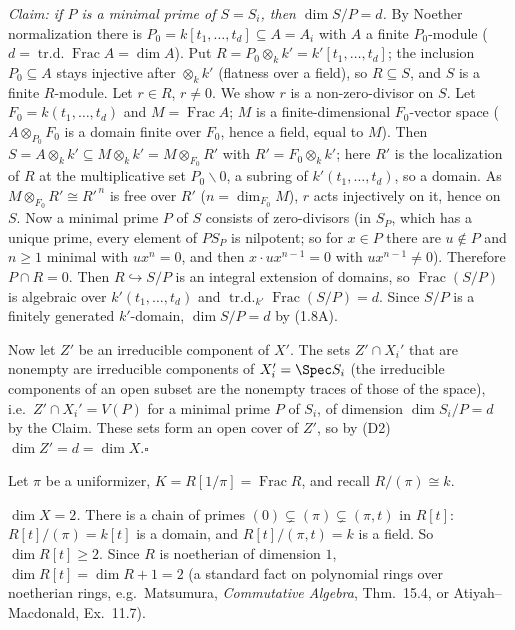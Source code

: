 \documentclass[11pt]{article}
\begin{document}
\emph{Claim: if $P$ is a minimal prime of $S=S_i$, then $\dim S/P=d$.} By Noether normalization there is $P_0=k[t_1,\dots,t_d]\subseteq A=A_i$ with $A$ a finite $P_0$-module ($d=\operatorname{tr.d.}\operatorname{Frac}A=\dim A$). Put $R=P_0\otimes_kk'=k'[t_1,\dots,t_d]$; the inclusion $P_0\subseteq A$ stays injective after $\otimes_kk'$ (flatness over a field), so $R\subseteq S$, and $S$ is a finite $R$-module. Let $r\in R$, $r\ne0$. We show $r$ is a non-zero-divisor on $S$. Let $F_0=k(t_1,\dots,t_d)$ and $M=\operatorname{Frac}A$; $M$ is a finite-dimensional $F_0$-vector space ($A\otimes_{P_0}F_0$ is a domain finite over $F_0$, hence a field, equal to $M$). Then $S=A\otimes_kk'\subseteq M\otimes_kk'=M\otimes_{F_0}R'$ with $R'=F_0\otimes_kk'$; here $R'$ is the localization of $R$ at the multiplicative set $P_0\smallsetminus0$, a subring of $k'(t_1,\dots,t_d)$, so a domain. As $M\otimes_{F_0}R'\cong R'^{\,n}$ is free over $R'$ ($n=\dim_{F_0}M$), $r$ acts injectively on it, hence on $S$. Now a minimal prime $P$ of $S$ consists of zero-divisors (in $S_P$, which has a unique prime, every element of $PS_P$ is nilpotent; so for $x\in P$ there are $u\notin P$ and $n\ge1$ minimal with $ux^n=0$, and then $x\cdot ux^{n-1}=0$ with $ux^{n-1}\ne0$). Therefore $P\cap R=0$. Then $R\hookrightarrow S/P$ is an integral extension of domains, so $\operatorname{Frac}(S/P)$ is algebraic over $k'(t_1,\dots,t_d)$ and $\operatorname{tr.d.}_{k'}\operatorname{Frac}(S/P)=d$. Since $S/P$ is a finitely generated $k'$-domain, $\dim S/P=d$ by (1.8A).

Now let $Z'$ be an irreducible component of $X'$. The sets $Z'\cap X_i'$ that are nonempty are irreducible components of $X'_i=\Spec S_i$ (the irreducible components of an open subset are the nonempty traces of those of the space), i.e.\ $Z'\cap X_i'=V(P)$ for a minimal prime $P$ of $S_i$, of dimension $\dim S_i/P=d$ by the Claim. These sets form an open cover of $Z'$, so by (D2) $\dim Z'=d=\dim X$.\hfill$\square$

\pf
Let $\pi$ be a uniformizer, $K=R[1/\pi]=\operatorname{Frac}R$, and recall $R/(\pi)\cong k$.

\emph{$\dim X=2$.} There is a chain of primes $(0)\subsetneq(\pi)\subsetneq(\pi,t)$ in $R[t]$: $R[t]/(\pi)=k[t]$ is a domain, and $R[t]/(\pi,t)=k$ is a field. So $\dim R[t]\ge2$. Since $R$ is noetherian of dimension $1$, $\dim R[t]=\dim R+1=2$ (a standard fact on polynomial rings over noetherian rings, e.g.\ Matsumura, \emph{Commutative Algebra}, Thm.~15.4, or Atiyah--Macdonald, Ex.~11.7).
\end{document}
